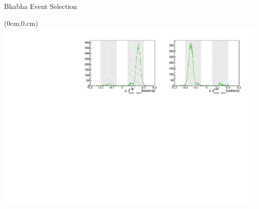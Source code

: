 \documentclass[8pt]{beamer}
\begin{document}
\begin{frame}{Bhabha Event Selection}
		\begin{textblock*}{1\textwidth}(0cm,0.cm)
		\centering
		\includegraphics[width=\textwidth]{VBilder/sb2b_MC.pdf}
	\end{textblock*}
	
	

	
\end{frame}
\end{document}
